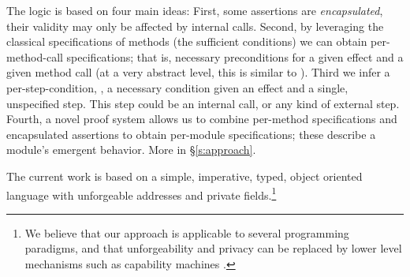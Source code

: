  
The \Nec logic is based on four main ideas: 
First, some assertions are \emph{encapsulated}, \ie
their validity may only be affected by internal calls. 
Second, by leveraging the classical  specifications of methods 
(\ie the sufficient conditions) we can obtain per-method-call
 \Nec specifications; that is, necessary preconditions
  for a given effect and a given method call (at a very abstract level, this is
similar to ).
Third we infer a per-step-condition, \ie, a necessary condition given an effect and a single, unspecified step. This step could be an internal call, or any kind of external step.
Fourth,  a novel proof system allows us to combine 
per-method \Nec specifications and encapsulated assertions 
 to obtain per-module   \Nec specifications; these describe a module's
 emergent behavior.
More in \S\ref{s:approach}.
 
 
  The current work is based on a simple, imperative, typed, object oriented
language with unforgeable addresses and private fields.\footnote{We believe
 that our approach is applicable to several programming paradigms, and 
 that   unforgeability and privacy
 can be replaced 
 by lower level mechanisms such as capability machines \cite{vanproving,davis2019cheriabi}.
}


% 
% 
%
% 
% 

